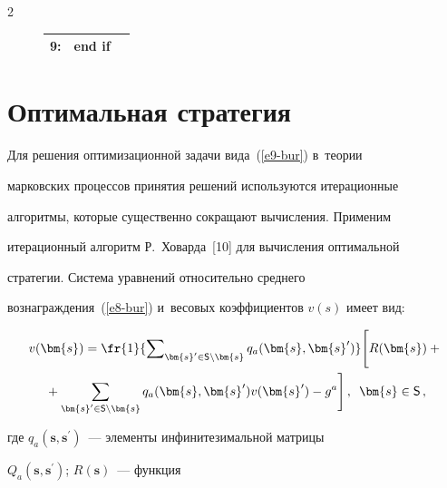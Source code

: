 \begin{multicols}{2}
\begin{figure}[b]
\begin{center}
\begin{tabular}{lll}
  9: & \textbf{end if} &\\


  \hline


  \end{tabular}


  \end{center}


  \end{figure}





  


  


  \section{Оптимальная стратегия}


  


  Для решения оптимизационной задачи вида~(\ref{e9-bur}) в~теории 


марковских процессов принятия решений используются итерационные 


алгоритмы, которые существенно сокращают вычисления. Применим 


итерационный алгоритм Р.~Ховарда~[10] для вы\-чис\-ле\-ния оптимальной 


стратегии. Система уравнений относительно среднего  


вознаграждения~(\ref{e8-bur}) и~весовых коэффициентов $v(s)$ имеет вид:


  \begin{multline}


  v(\bm{s}) =\fr{1}{\sum\nolimits_{\bm{s}^\prime \in \mathsf{S}\backslash 


\bm{s}} q_a(\bm{s},\bm{s}^\prime)}\Bigg[ R(\bm{s})+{}\\


{}+\sum\limits_{\bm{s}^\prime 


\in \mathsf{S}\backslash \bm{s}} q_a(\bm{s},\bm{s}^\prime) v(\bm{s}^\prime) -


g^a\Bigg]\,,\enskip 


  \bm{s}\in \mathsf{S}\,,


  \label{e10-bur}


  \end{multline}


    где $q_a(\bm{s},\bm{s}^\prime)$~--- элементы инфинитезимальной мат\-ри\-цы 


$Q_a(\bm{s},\bm{s}^\prime)$; $R(\bm{s})$~--- функция 



\end{multicols}
